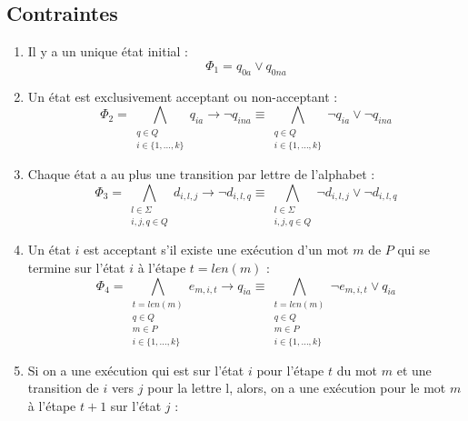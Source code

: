\documentclass[a4paper, 12pt]{extarticle}
\begin{document}
\subsection{Contraintes} %
\label{sub:contraintes}

\begin{enumerate}
    \item Il y a un unique état initial :
    \begin{equation*}
        \Phi_1=q_{0a} \vee q_{0na}
    \end{equation*}
    \item Un état est exclusivement acceptant ou non-acceptant :
    \begin{equation*}
        \Phi_2=\bigwedge_{\substack{q\in Q \\ i\in \{1,\dots,k\}}} q_{ia} \rightarrow \neg q_{ina}\equiv
        \bigwedge_{\substack{q\in Q \\ i\in \{1,\dots,k\}}} \neg q_{ia} \vee \neg q_{ina}
    \end{equation*}
    \item Chaque état a au plus une transition par lettre de l'alphabet :
    \begin{equation*}
        \Phi_3=\bigwedge_{\substack{l\in \Sigma\\i,j,q \in Q}} d_{i,l,j} \rightarrow \neg d_{i,l,q}\equiv
        \bigwedge_{\substack{l\in \Sigma\\i,j,q \in Q}}\neg d_{i,l,j} \vee \neg d_{i,l,q}
    \end{equation*}
    \item Un état $i$ est acceptant s'il existe une exécution d'un mot $m$ de $P$ qui se termine sur l'état $i$ à l'étape $t=len(m)$ :
    \begin{equation*}
        \Phi_4=\bigwedge_{\substack{t=len(m)\\q \in Q\\ m \in P\\ i \in \{1,\dots,k\}}} e_{m,i,t} \rightarrow q_{ia} \equiv
        \bigwedge_{\substack{t=len(m)\\q \in Q\\ m \in P\\ i \in \{1,\dots,k\}}} \neg e_{m,i,t} \vee q_{ia}
    \end{equation*}
    \item Si on a une exécution qui est sur l'état $i$ pour l'étape $t$ du mot $m$ et une transition de $i$ vers $j$ pour la lettre l,
    alors, on a une exécution pour le mot $m$ à l'étape $t+1$ sur l'état $j$ :

\end{enumerate}
\end{document}
